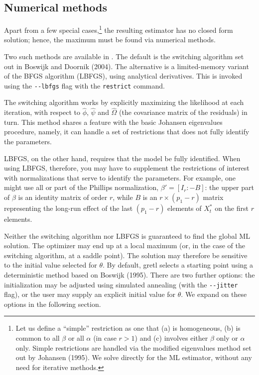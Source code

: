 \subsection{Numerical methods}
\label{sec:vecm-opt}

Apart from a few special cases,\footnote{Let us define a ``simple''
  restriction as one that (a) is homogeneous, (b) is common to all
  $\beta$ or all $\alpha$ (in case $r>1$) and (c) involves either
  $\beta$ only or $\alpha$ only.  Simple restrictions are handled via
  the modified eigenvalues method set out by Johansen (1995).  We
  solve directly for the ML estimator, without any need for iterative
  methods.} the resulting estimator has no closed form solution;
hence, the maximum must be found via numerical methods.

Two such methods are available in . The default is the
switching algorithm set out in Boswijk and Doornik (2004).  The
alternative is a limited-memory variant of the BFGS algorithm (LBFGS),
using analytical derivatives.  This is invoked using the
\verb+--lbfgs+ flag with the \texttt{restrict} command.

The switching algorithm works by explicitly maximizing the likelihood
at each iteration, with respect to $\hat{\phi}$, $\hat{\psi}$ and
$\hat{\Omega}$ (the covariance matrix of the residuals) in turn.  This
method shares a feature with the basic Johansen eigenvalues procedure,
namely, it can handle a set of restrictions that does not fully
identify the parameters.

LBFGS, on the other hand, requires that the model be fully identified.
When using LBFGS, therefore, you may have to supplement the
restrictions of interest with normalizations that serve to identify
the parameters.  For example, one might use all or part of the
Phillips normalization, $\beta' = [I_r : -B]$: the upper part of
$\beta$ is an identity matrix of order $r$, while $B$ is an $r \times
(p_1 - r)$ matrix representing the long-run effect of the last $(p_1 -
r)$ elements of $X^*_t$ on the first $r$ elements.

Neither the switching algorithm nor LBFGS is guaranteed to find the
global ML solution.  The optimizer may end up at a local maximum (or,
in the case of the switching algorithm, at a saddle point).  The
solution may therefore be sensitive to the initial value selected for
$\theta$.  By default, gretl selects a starting point using a
deterministic method based on Boswijk (1995).  There are two further
options: the initialization may be adjusted using simulated annealing
(with the \verb+--jitter+ flag), or the user may supply an explicit
initial value for $\theta$.  We expand on these options in the
following section.

